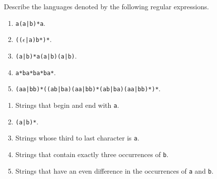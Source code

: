 \begin{exercise}\label{ex:030302}
    Describe the languages denoted by the following regular expressions.
    \begin{enumerate}[label=\alph*)]
        \item \texttt{a(a|b)*a}.
        \item \texttt{(($\epsilon$|a)b*)*}.
        \item \texttt{(a|b)*a(a|b)(a|b)}.
        \item \texttt{a*ba*ba*ba*}.
        \item \texttt{(aa|bb)*((ab|ba)(aa|bb)*(ab|ba)(aa|bb)*)*}.
    \end{enumerate}
\end{exercise}
\begin{solution}\label{sol:030302}
    \begin{enumerate}[label=\alph*)]
        \item Strings that begin and end with \texttt{a}.
        \item \texttt{(a|b)*}.
        \item Strings whose third to last character is \texttt{a}.
        \item Strings that contain exactly three occurrences of 
        \texttt{b}.
        \item Strings that have an even difference in the occurrences of 
        \texttt{a} and \texttt{b}.
    \end{enumerate}
\end{solution}